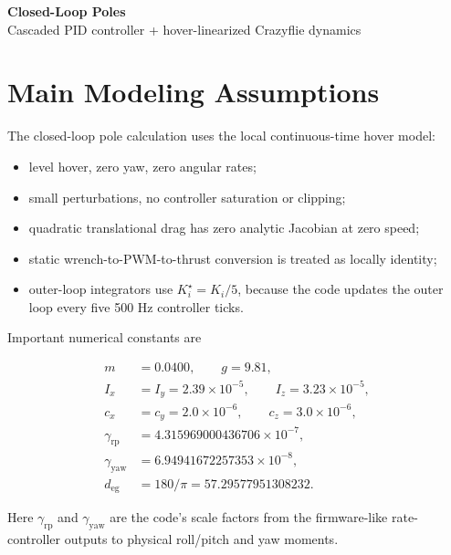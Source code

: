\documentclass[11pt]{article}
\newcommand{\degc}{d_{\mathrm{eg}}}
\newcommand{\gammar}{\gamma_{\mathrm{rp}}}
\newcommand{\gammay}{\gamma_{\mathrm{yaw}}}
\begin{document}
\begin{center}
{\Huge\bfseries Closed-Loop Poles}\\[0.25em]
{\large Cascaded PID controller + hover-linearized Crazyflie dynamics}
\end{center}


\section{Main Modeling Assumptions}

The closed-loop pole calculation uses the local continuous-time hover model:

\begin{itemize}
  \item level hover, zero yaw, zero angular rates;
  \item small perturbations, no controller saturation or clipping;
  \item quadratic translational drag has zero analytic Jacobian at zero speed;
  \item static wrench-to-PWM-to-thrust conversion is treated as locally identity;
  \item outer-loop integrators use \(K_i^\star=K_i/5\), because the code updates
        the outer loop every five 500 Hz controller ticks.
\end{itemize}

Important numerical constants are

\[
\begin{aligned}
m &= 0.0400,\qquad
g = 9.81,\\
I_x &= I_y = 2.39\times 10^{-5},\qquad
I_z = 3.23\times 10^{-5},\\
c_x &= c_y = 2.0\times 10^{-6},\qquad
c_z = 3.0\times 10^{-6},\\
\gammar &= 4.315969000436706\times 10^{-7},\\
\gammay &= 6.94941672257353\times 10^{-8},\\
\degc &= 180/\pi = 57.29577951308232.
\end{aligned}
\]

Here \(\gammar\) and \(\gammay\) are the code's scale factors from the
firmware-like rate-controller outputs to physical roll/pitch and yaw moments.
\end{document}
